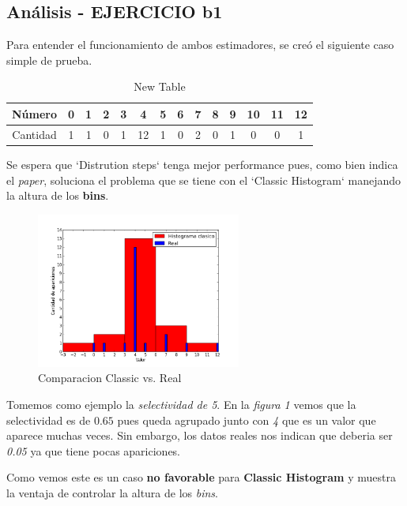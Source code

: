 \documentclass[10pt, a4paper,english,spanish,hidelinks]{article}
\begin{document}
\subsection{Análisis - EJERCICIO b1}

Para entender el funcionamiento de ambos estimadores, se creó el siguiente caso simple de prueba.

\begin{table}[htdp]
  \begin{center}
    \begin{tabular}{|c|c|c|c|c|c|c|c|c|c|c|c|c|c|} \hline
       Número  & 0 & 1 & 2 & 3 & 4 & 5 & 6 & 7 & 8 & 9 & 10 & 11 & 12 \\ \hline
       Cantidad & 1 & 1 & 0 & 1 & 12 & 1 & 0 & 2 & 0 & 1 & 0 & 0 & 1 \\ \hline
    \end{tabular}
  \end{center}
  \caption{New Table}
  \label{tab:newTable}
\end{table}


Se espera que `Distrution steps` tenga mejor performance pues, como bien indica el \textit{paper},
soluciona el problema que se tiene con el `Classic Histogram` manejando la altura
de los \textbf{bins}.

\begin{figure}[h!]
  \centering
  \includegraphics[width=0.6\textwidth]{./imagenes/ejb1_ejemplo_classic_y_real.png}
  \caption{Comparacion Classic vs. Real}
\end{figure}


Tomemos como ejemplo la \textit{selectividad de 5}.
En la \textit{figura 1} vemos que la selectividad es de $0.65$ pues queda agrupado junto
con \textit{4} que es un valor que aparece muchas veces. Sin embargo, los datos reales nos
indican que deberia ser \textit{0.05} ya que tiene pocas apariciones.

Como vemos este es un caso \textbf{no favorable} para \textbf{Classic Histogram} y
muestra la ventaja de controlar la altura de los \textit{bins}.
\end{document}
